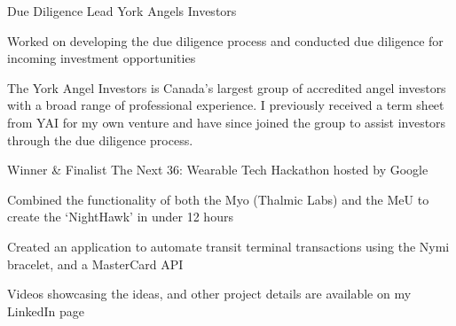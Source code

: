 

\begin{cventries}
  \cventry
    {Due Diligence Lead} %
    {York Angels Investors} %
    {} %
    {} %
    {
      \begin{cvitems}
            {
            \item {Worked on developing the due diligence process and conducted due diligence for incoming investment opportunities}
            }
      \end{cvitems}
    }
    {
         \begin{cventrysummary}
     The York Angel Investors is Canada's largest group of accredited angel investors with a broad range of professional experience. I previously received a term sheet from YAI for my own venture and have since joined the group to assist investors through the due diligence process.
     \end{cventrysummary}
    }
\vspace{-1.5mm}

  \cventry
    {Winner \& Finalist} %
    {The Next 36: Wearable Tech Hackathon hosted by Google} %
    {} %
    {} %
    {
      \begin{cvitems}
            {
            \item {Combined the functionality of both the Myo (Thalmic Labs) and the MeU to create the ‘NightHawk’ in under 12 hours}
            \item {Created an application to automate transit terminal transactions using the Nymi bracelet, and a MasterCard API}
            \item {Videos showcasing the ideas, and other project details are available on my LinkedIn page}
            }
      \end{cvitems}
    }
    {}

\end{cventries}
